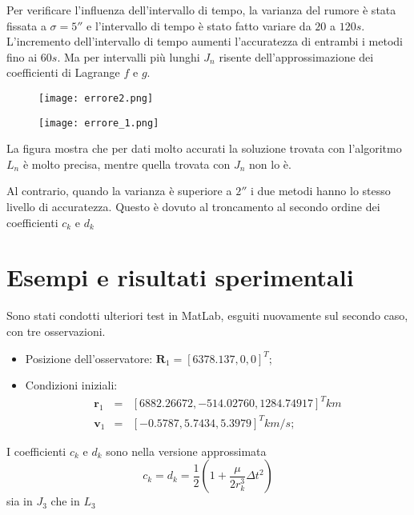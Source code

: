\documentclass{beamer}
\begin{document}
\begin{frame}[plain]
Per verificare l'influenza dell'intervallo di tempo, la varianza del rumore \`e stata fissata a $\sigma=5''$ e l'intervallo di tempo \`e stato fatto variare da $20$ a $120s$. L'incremento dell'intervallo di tempo aumenti l'accuratezza di entrambi i metodi fino ai $60s$. Ma per intervalli pi\`u lunghi $J_n$ risente dell'approssimazione dei coefficienti di Lagrange $f$ e $g$.
\begin{figure}
\centering
\texttt{[image: errore2.png]}
\end{figure}
\end{frame}

\begin{frame}[plain]
\begin{figure}
\centering
\texttt{[image: errore\_1.png]}
\end{figure}

La figura mostra che per dati molto accurati la soluzione trovata con l'algoritmo $L_n$ \`e molto precisa, mentre quella trovata con $J_n$ non lo \`e. 

Al contrario, quando la varianza \`e superiore a $2''$ i due metodi hanno lo stesso livello di accuratezza.   
Questo \`e dovuto al troncamento al secondo ordine dei coefficienti $c_k$ e $d_k$
\end{frame}

\section{Esempi e risultati sperimentali}
\begin{frame}
Sono stati condotti ulteriori test in MatLab, esguiti nuovamente sul secondo caso, con tre osservazioni. \begin{itemize}
\item Posizione dell'osservatore: $\textbf{R}_1=[6 378.137, 0, 0]^T$;
\item Condizioni iniziali: \begin{eqnarray*}
\textbf{r}_1 &=&[6882.26672, -514.02760,1284.74917 ]^T km \\
\textbf{v}_1 &= &[-0.5787, 5.7434, 5.3979]^T km/s;
\end{eqnarray*}
\end{itemize}
I coefficienti $c_k$ e $d_k$ sono nella versione approssimata \begin{equation}
c_k=d_k=\frac{1}{2} \left(1+ \frac{\mu}{2r_k^3} \Delta t^2 \right)
\end{equation}
sia in $J_3$ che in $L_3$
\end{frame}
\end{document}
